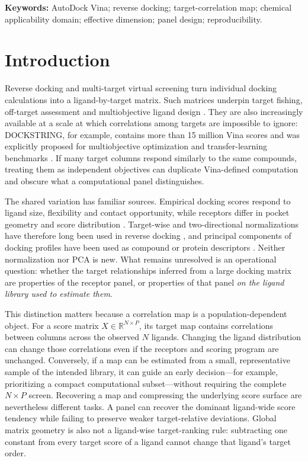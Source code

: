 \documentclass[11pt]{article}
\begin{document}
\noindent\textbf{Keywords:} AutoDock Vina; reverse docking; target-correlation
map; chemical applicability domain; effective dimension; panel design;
reproducibility.

\section{Introduction}

Reverse docking and multi-target virtual screening turn individual docking
calculations into a ligand-by-target matrix. Such matrices underpin target
fishing, off-target assessment and multiobjective ligand design
\cite{luo2017,lapillo2019,lee2020crds,krause2023}. They are also increasingly
available at a scale at which correlations among targets are impossible to
ignore: DOCKSTRING, for example, contains more than 15 million Vina scores and
was explicitly proposed for multiobjective optimization and transfer-learning
benchmarks \cite{dockstring2022}. If many target columns respond similarly to
the same compounds, treating them as independent objectives can duplicate
Vina-defined computation and obscure what a computational panel distinguishes.

The shared variation has familiar sources. Empirical docking scores respond to
ligand size, flexibility and contact opportunity, while receptors differ in
pocket geometry and score distribution \cite{pan2003,vigers2004,jacobsson2006}.
Target-wise and two-directional normalizations have therefore long been used in
reverse docking \cite{carta2007,sepresa2009,casey2009,luo2017}, and principal
components of docking profiles have been used as compound or protein
descriptors \cite{fukunishi2005,fukunishi2006,fukunishi2018}. Neither
normalization nor PCA is new. What remains unresolved is an operational question:
whether the target relationships inferred from a large docking matrix are
properties of the receptor panel, or properties of that panel \emph{on the
ligand library used to estimate them}.

This distinction matters because a correlation map is a population-dependent
object. For a score matrix $X\in\mathbb{R}^{N\times P}$, its target map contains
correlations between columns across the observed $N$ ligands. Changing the
ligand distribution can change those correlations even if the receptors and
scoring program are unchanged. Conversely, if a map can be estimated from a
small, representative sample of the intended library, it can guide an early
decision---for example, prioritizing a compact computational subset---without
requiring the complete $N\times P$ screen. Recovering a map and compressing the
underlying score surface are nevertheless different tasks. A panel can recover
the dominant ligand-wide score tendency while failing to preserve weaker
target-relative deviations. Global matrix geometry is also not a ligand-wise
target-ranking rule: subtracting one constant from every target score of a
ligand cannot change that ligand's target order.
\end{document}
